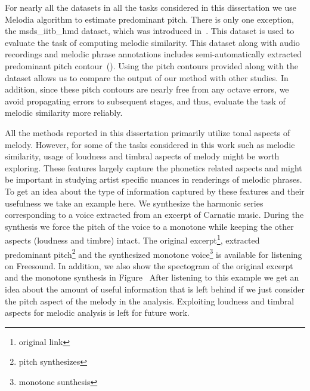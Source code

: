 {{For nearly all the datasets in all the tasks considered in this dissertation we use Melodia algorithm to estimate predominant pitch. There is only one exception, the \acrshort{msds_iitb_hmd} dataset, which was introduced in~\cite{Ross2012b}. This dataset is used to evaluate the task of computing melodic similarity. This dataset along with audio recordings and melodic phrase annotations includes semi-automatically extracted predominant pitch contour~(). Using the pitch contours provided along with the dataset allows us to compare the output of our method with other studies. In addition, since these pitch contours are nearly free from any octave errors, we avoid propagating errors to subsequent stages, and thus, evaluate the task of melodic similarity more reliably. 

All the methods reported in this dissertation primarily utilize tonal aspects of melody. However, for some of the tasks considered in this work such as melodic similarity, usage of loudness and timbral aspects of melody might be worth exploring. These features largely capture the phonetics related aspects and might be important in studying artist specific nuances in renderings of melodic phrases. To get an idea about the type of information captured by these features and their usefulness we take an example here. We synthesize the harmonic series corresponding to a voice extracted from an excerpt of Carnatic music. During the synthesis we force the pitch of the voice to a monotone while keeping the other aspects (loudness and timbre) intact. The original excerpt\footnote{original link}, extracted predominant pitch\footnote{pitch synthesizes} and the synthesized monotone voice\footnote{monotone sunthesis} is available for listening on Freesound. In addition, we also show the spectogram of the original excerpt and the monotone synthesis in Figure~ After listening to this example we get an idea about the amount of useful information that is left behind if we just consider the pitch aspect of the melody in the analysis. Exploiting loudness and timbral aspects for melodic analysis is left for future work.

}}

